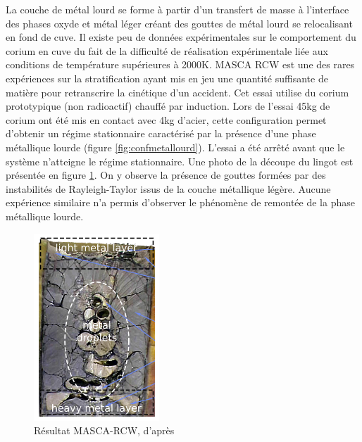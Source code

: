 La couche de métal lourd se forme à partir d'un transfert de masse à l'interface des phases oxyde et métal léger créant des gouttes de métal lourd se relocalisant en fond de cuve. Il existe peu de données expérimentales sur le comportement du corium en cuve du fait de la difficulté de réalisation expérimentale liée aux conditions de température supérieures à 2000K. MASCA RCW \cite{tsurikov_main_nodate} est une des rares expériences sur la stratification ayant mis en jeu une quantité suffisante de matière pour retranscrire la cinétique d'un accident. Cet essai utilise du corium prototypique (non radioactif) chauffé par induction. Lors de l'essai 45kg de corium ont été mis en contact avec 4kg d'acier, cette configuration permet d'obtenir un régime stationnaire caractérisé par la présence d'une phase métallique lourde (figure \ref{fig:confmetallourd}). L'essai a été arrêté avant que le système n'atteigne le régime stationnaire. Une photo de la découpe du lingot est présentée en figure \ref{fig:masca}. On y observe la présence de gouttes formées par des instabilités de Rayleigh-Taylor issus de la couche métallique légère. Aucune expérience similaire n'a permis d'observer le phénomène de remontée de la phase métallique lourde.

 \begin{figure}[H]
	\centering
	\includegraphics[width=0.3\linewidth]{figure/MASCA_RCW.png}
	\caption[Résultat MASCA-RCW 100]{Résultat MASCA-RCW, d'après \cite{tellier_interfaces_2019}}
	\label{fig:masca}
\end{figure}


